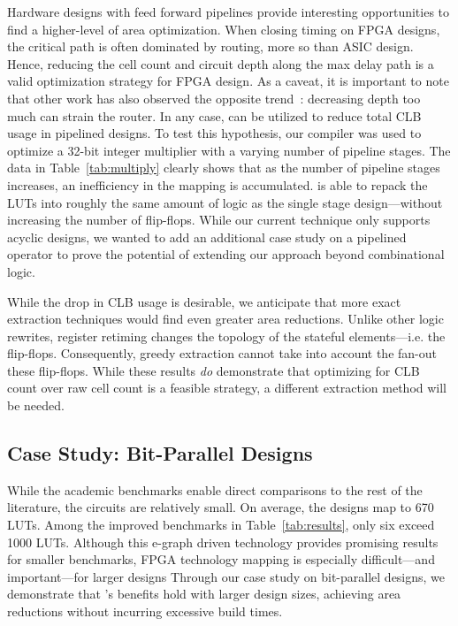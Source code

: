 Hardware designs with feed forward pipelines provide interesting opportunities
to find a higher-level of area optimization. When closing timing on FPGA
designs, the critical path is often dominated by routing, more so than ASIC
design. Hence, reducing the cell count and circuit depth along the max delay
path is a valid optimization strategy for FPGA design. As a caveat, it is
important to note that other work has also observed the opposite
trend~\cite{academicfpga}: decreasing depth too much can strain the router. In
any case, \shortname{} can be utilized to reduce total CLB usage in pipelined
designs. To test this hypothesis, our compiler was used to optimize a 32-bit
integer multiplier with a varying number of pipeline stages. The data in
Table~\ref{tab:multiply} clearly shows that as the number of pipeline stages
increases, an inefficiency in the mapping is accumulated. \shortname{} is able
to repack the LUTs into roughly the same amount of logic as the single stage
design---without increasing the number of flip-flops. While our current
technique only supports acyclic designs, we wanted to add an additional case
study on a pipelined operator to prove the potential of extending our approach
beyond combinational logic.

While the drop in CLB usage is desirable, we anticipate that more exact
extraction techniques would find even greater area reductions. Unlike other
logic rewrites, register retiming changes the topology of the stateful
elements---i.e. the flip-flops. Consequently, greedy extraction cannot take
into account the fan-out these flip-flops. While these results \textit{do}
demonstrate that optimizing for CLB count over raw cell count is a feasible
strategy, a different extraction method will be needed.

\subsection{Case Study: Bit-Parallel Designs}\label{sec:results:scalability}

While the academic benchmarks enable direct comparisons to the rest of the
literature, the circuits are relatively small. On average, the designs map to
670 LUTs. Among the \nimproved{} improved benchmarks in
Table~\ref{tab:results}, only six exceed 1000 LUTs. Although this e-graph
driven technology provides promising results for smaller benchmarks, FPGA
technology mapping is especially difficult---and important---for larger designs
Through our case study on bit-parallel designs, we demonstrate that
\shortname{}'s benefits hold with larger design sizes, achieving area
reductions without incurring excessive build times.

